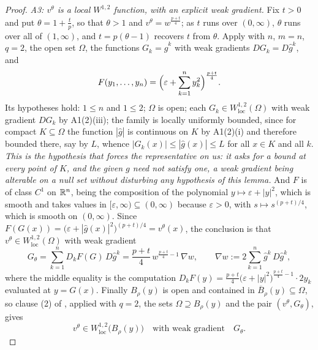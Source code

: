 \begin{proof}
\emph{A3: $v^\theta$ is a local $W^{1,2}$ function, with an explicit weak
gradient.}  Fix $t>0$ and put $\theta=1+\frac tp$, so that $\theta>1$ and
$v^\theta=w^{\frac{p+t}4}$; as $t$ runs over $(0,\infty)$, $\theta$ runs over
all of $(1,\infty)$, and $t=p(\theta-1)$ recovers $t$ from $\theta$.  Apply
 with $n$, $m=n$, $q=2$, the open set $\Omega$,
the functions $G_k=\hat g^k$ with weak gradients $DG_k=D\hat g^k$, and
\[
F(y_1,\dots,y_n)=\Bigl(\varepsilon+\sum_{k=1}^ny_k^2\Bigr)^{\frac{p+t}4}.
\]
Its hypotheses hold: $1\le n$ and $1\le2$; $\Omega$ is open; each
$G_k\in W^{1,2}_{\mathrm{loc}}(\Omega)$ with weak gradient $DG_k$ by A1(2)(iii);
the family is locally uniformly bounded, since for compact $K\subseteq\Omega$
the function $|\hat g|$ is continuous on $K$ by A1(2)(i) and therefore bounded
there, say by $L$, whence $|G_k(x)|\le|\hat g(x)|\le L$ for all $x\in K$ and all
$k$.  \emph{This is the hypothesis that forces the representative on us: it asks
for a bound at \emph{every} point of $K$, and the given $g$ need not satisfy
one, a weak gradient being alterable on a null set without disturbing any
hypothesis of this lemma.}  And $F$ is of class $C^1$ on $\mathbb{R}^n$, being the
composition of the polynomial $y\mapsto\varepsilon+|y|^2$, which is smooth and
takes values in $[\varepsilon,\infty)\subseteq(0,\infty)$ because
$\varepsilon>0$, with $s\mapsto s^{(p+t)/4}$, which is smooth on $(0,\infty)$.
Since $F(G(x))=\bigl(\varepsilon+|\hat g(x)|^2\bigr)^{(p+t)/4}=v^\theta(x)$, the
conclusion is that $v^\theta\in W^{1,2}_{\mathrm{loc}}(\Omega)$ with weak
gradient
\[
G_\theta=\sum_{k=1}^nD_kF(G)\,D\hat g^k
=\frac{p+t}4\,w^{\frac{p+t}4-1}\,\nabla w,
\qquad
\nabla w:=2\sum_{k=1}^n\hat g^k\,D\hat g^k ,
\]
where the middle equality is the computation
$D_kF(y)=\frac{p+t}4\bigl(\varepsilon+|y|^2\bigr)^{\frac{p+t}4-1}\cdot2y_k$
evaluated at $y=G(x)$.  Finally $B_\rho(y)$ is open and contained in
$\overline B_\rho(y)\subseteq\Omega$, so clause (2) of
, applied with $q=2$, the sets
$\Omega\supseteq B_\rho(y)$ and the pair $(v^\theta,G_\theta)$, gives
\[
v^\theta\in W^{1,2}_{\mathrm{loc}}\bigl(B_\rho(y)\bigr)
\quad\text{with weak gradient}\quad G_\theta .
\tag{A3}
\]


\end{proof}
